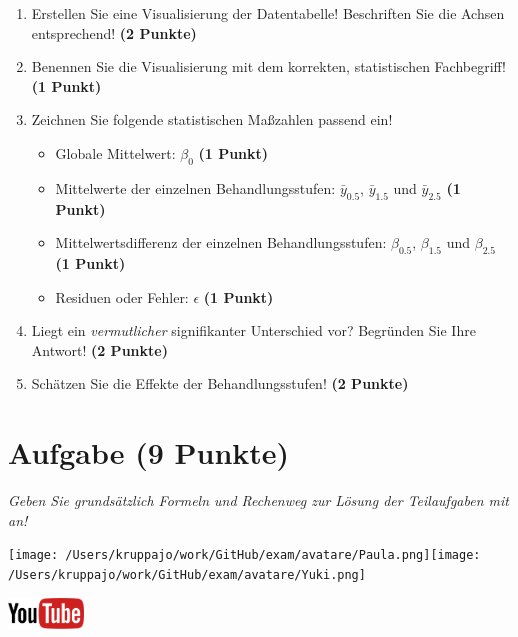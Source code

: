 \documentclass[a4paper, 9pt]{scrartcl}\usepackage[]{graphicx}\usepackage[]{xcolor}
\begin{document}
\begin{enumerate}
\item Erstellen  Sie  eine  Visualisierung  der  Datentabelle! Beschriften  Sie  die  Achsen  entsprechend! \textbf{(2 Punkte)}
\item Benennen Sie die Visualisierung mit dem korrekten, statistischen Fachbegriff! \textbf{(1 Punkt)}
\item Zeichnen Sie folgende statistischen Maßzahlen passend ein! 
  \begin{itemize}
  \item Globale Mittelwert: $\beta_0$ \textbf{(1 Punkt)}
  \item Mittelwerte der einzelnen Behandlungsstufen: $\bar{y}_{0.5}$, $\bar{y}_{1.5}$ und $\bar{y}_{2.5}$ \textbf{(1 Punkt)}
  \item Mittelwertsdifferenz der einzelnen Behandlungsstufen: $\beta_{0.5}$, $\beta_{1.5}$ und $\beta_{2.5}$ \textbf{(1 Punkt)}
  \item Residuen oder Fehler: $\epsilon$ \textbf{(1 Punkt)}
  \end{itemize}
\item Liegt ein \textit{vermutlicher} signifikanter Unterschied vor? Begründen Sie Ihre Antwort! \textbf{(2 Punkte)}
\item Schätzen Sie die Effekte der Behandlungsstufen! \textbf{(2 Punkte)}
\end{enumerate}
 
\clearpage

\section{Aufgabe \hfill (9 Punkte)}

\textit{Geben Sie grundsätzlich Formeln und Rechenweg zur Lösung der Teilaufgaben mit an!} \\[1Ex]
 

 
\begin{minipage}[t]{0.5\textwidth}
\texttt{[image: /Users/kruppajo/work/GitHub/exam/avatare/Paula.png]}\hspace{-4mm}\texttt{[image: /Users/kruppajo/work/GitHub/exam/avatare/Yuki.png]}
\end{minipage}
\begin{minipage}[t]{0.5\textwidth}
\hfill
\href{https://youtu.be/IhecxMcCENY}{\includegraphics[width = 2cm]{img/youtube}}
\end{minipage}
\vspace{1ex}
\end{document}
